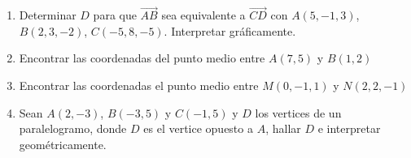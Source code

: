 \documentclass[a4paper]{article}
\newcommand{\vect}[1]{\overrightarrow{#1}}
\begin{document}
\begin{enumerate}
\begin{enumerate} [label=(\alph*)]
		\item Determinar $D$ para que $\vect{AB}$ sea equivalente a $\vect{CD}$ con $A(5,-1,3)$, $B(2,3,-2)$, $C(-5,8,-5)$. Interpretar gráficamente.
		\item Encontrar las coordenadas del punto medio entre $A(7,5)$ y $B(1,2)$
		\item Encontrar las coordenadas el punto medio entre $M(0,-1,1)$ y $N(2,2,-1)$
		\item Sean $A(2,-3)$, $B(-3,5)$ y $C(-1,5)$ y $D$ los vertices de un paralelogramo, donde $D$ es el vertice opuesto a $A$, hallar $D$ e interpretar geométricamente.
	\end{enumerate}
\end{enumerate}
\vspace{20pt} 
\end{document}
